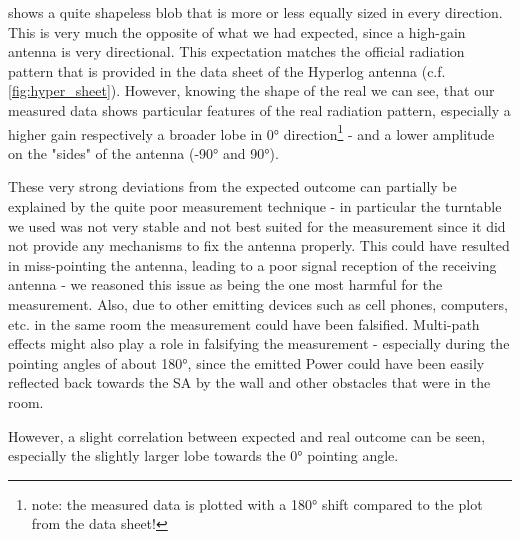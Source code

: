 
 shows a quite shapeless blob that is more or less equally sized in every direction. This is very much the opposite of what we had expected, since a high-gain antenna is very directional. This expectation matches the official radiation pattern that is provided in the data sheet of the Hyperlog antenna (c.f. \cref{fig:hyper_sheet}). However, knowing the shape of the real we can see, that our measured data shows particular features of the real radiation pattern, especially a higher gain respectively a broader lobe in 0° direction\footnote{note: the measured data is plotted with a 180° shift compared to the plot from the data sheet!} - and a lower amplitude on the "sides" of the antenna (-90° and 90°).

These very strong deviations from the expected outcome can partially be explained by the quite poor measurement technique - in particular the turntable we used was not very stable and not best suited for the measurement since it did not provide any mechanisms to fix the antenna properly. This could have resulted in miss-pointing the antenna, leading to a poor signal reception of the receiving antenna -  we reasoned this issue as being the one most harmful for the measurement. Also, due to other emitting devices such as cell phones, computers, etc. in the same room the measurement could have been falsified. Multi-path effects might also play a role in falsifying the measurement - especially during the pointing angles of about 180°, since the emitted Power could have been easily reflected back towards the SA by the wall and other obstacles that were in the room.

However, a slight correlation between expected and real outcome can be seen, especially the slightly larger lobe towards the 0° pointing angle.


